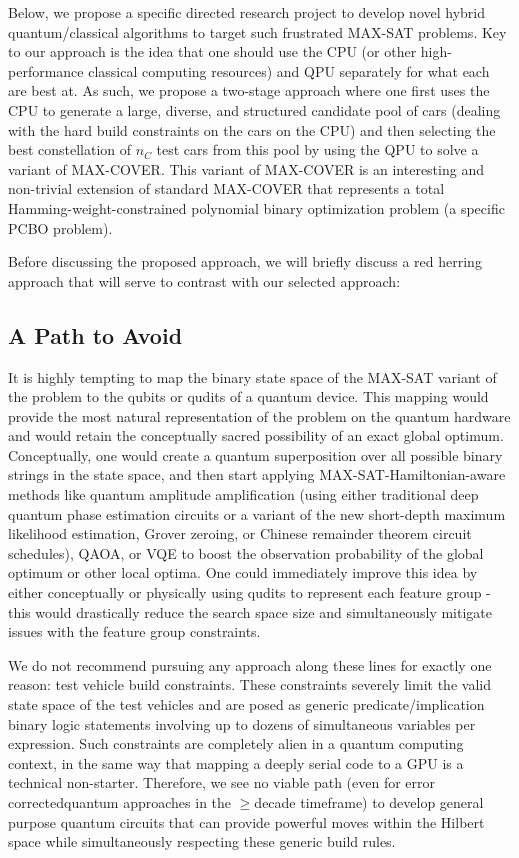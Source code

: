 \documentclass[aps,pra,twocolumn,superscriptaddress,groupedaddress]{revtex4}  %
\begin{document}
Below, we propose a specific directed research project to develop novel hybrid
quantum/classical algorithms to target such frustrated MAX-SAT problems. Key to
our approach is the idea that one should use the CPU (or other high-performance
classical computing resources) and QPU separately for what each are best at. As
such, we propose a two-stage approach where one first uses the CPU to generate a
large, diverse, and structured candidate pool of cars (dealing with the hard
build constraints on the cars on the CPU) and then selecting the best
constellation of $n_{C}$ test cars from this pool by using the QPU to solve a
variant of MAX-COVER. This variant of MAX-COVER is an interesting and
non-trivial extension of standard MAX-COVER that represents a total
Hamming-weight-constrained polynomial binary optimization problem (a specific
PCBO problem). 

Before discussing the proposed approach, we will briefly discuss a red herring
approach that will serve to contrast with our selected approach:

\subsection{A Path to Avoid}

It is highly tempting to map the binary state space of the MAX-SAT variant of
the problem to the qubits or qudits of a quantum device. This mapping would
provide the most natural representation of the problem on the quantum hardware
and would retain the conceptually sacred possibility of an exact global optimum.
Conceptually, one would create a quantum superposition over all possible binary
strings in the state space, and then start applying MAX-SAT-Hamiltonian-aware
methods like quantum amplitude amplification (using either traditional deep
quantum phase estimation circuits or a variant of the new short-depth maximum
likelihood estimation, Grover zeroing, or Chinese remainder theorem circuit
schedules), QAOA, or VQE to boost the observation probability of the global
optimum or other local optima. One could immediately improve this idea by either
conceptually or physically using qudits to represent each feature group - this
would drastically reduce the search space size and simultaneously mitigate
issues with the feature group constraints.

We do not recommend pursuing any approach along these lines for exactly one reason:
test vehicle build constraints. These constraints severely limit the valid state
space of the test vehicles and are posed as generic predicate/implication binary
logic statements involving up to dozens of simultaneous variables per expression. Such
constraints are completely alien in a quantum computing context, in the same way
that mapping a deeply serial code to a GPU is a technical non-starter.
Therefore, we see no viable path (even for error correctedquantum  approaches in
the $\geq$decade timeframe) to develop general purpose quantum circuits that can
provide powerful moves within the Hilbert space while simultaneously respecting
these generic build rules.
\end{document}
